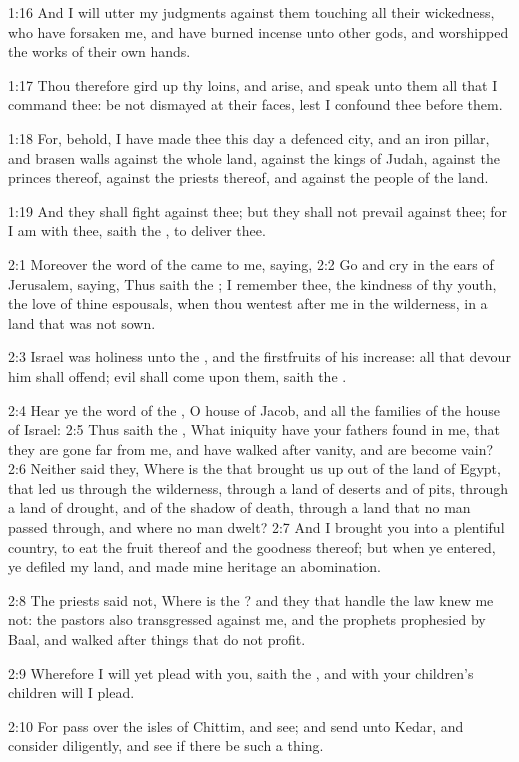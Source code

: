 1:16 And I will utter my judgments against them touching all their wickedness, who have forsaken me, and have burned incense unto other gods, and worshipped the works of their own hands.

1:17 Thou therefore gird up thy loins, and arise, and speak unto them all that I command thee: be not dismayed at their faces, lest I confound thee before them.

1:18 For, behold, I have made thee this day a defenced city, and an iron pillar, and brasen walls against the whole land, against the kings of Judah, against the princes thereof, against the priests thereof, and against the people of the land.

1:19 And they shall fight against thee; but they shall not prevail against thee; for I am with thee, saith the \LORD, to deliver thee.

2:1 Moreover the word of the \LORD came to me, saying, 2:2 Go and cry in the ears of Jerusalem, saying, Thus saith the \LORD; I remember thee, the kindness of thy youth, the love of thine espousals, when thou wentest after me in the wilderness, in a land that was not sown.

2:3 Israel was holiness unto the \LORD, and the firstfruits of his increase: all that devour him shall offend; evil shall come upon them, saith the \LORD.

2:4 Hear ye the word of the \LORD, O house of Jacob, and all the families of the house of Israel: 2:5 Thus saith the \LORD, What iniquity have your fathers found in me, that they are gone far from me, and have walked after vanity, and are become vain?  2:6 Neither said they, Where is the \LORD that brought us up out of the land of Egypt, that led us through the wilderness, through a land of deserts and of pits, through a land of drought, and of the shadow of death, through a land that no man passed through, and where no man dwelt?  2:7 And I brought you into a plentiful country, to eat the fruit thereof and the goodness thereof; but when ye entered, ye defiled my land, and made mine heritage an abomination.

2:8 The priests said not, Where is the \LORD? and they that handle the law knew me not: the pastors also transgressed against me, and the prophets prophesied by Baal, and walked after things that do not profit.

2:9 Wherefore I will yet plead with you, saith the \LORD, and with your children's children will I plead.

2:10 For pass over the isles of Chittim, and see; and send unto Kedar, and consider diligently, and see if there be such a thing.

